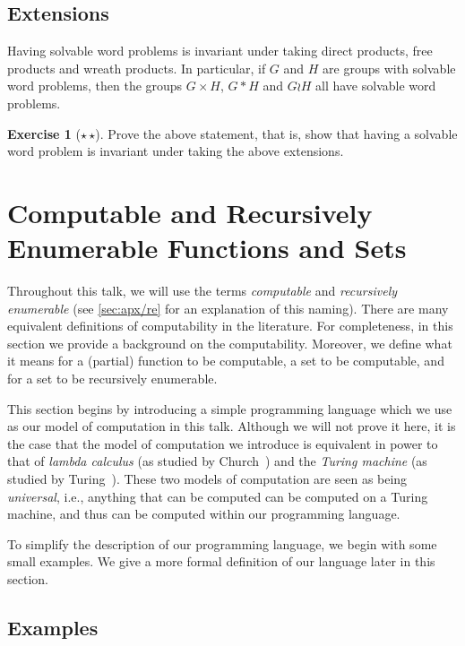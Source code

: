 \documentclass[11pt,a4paper,reqno]{amsart}
\theoremstyle{plain}
\theoremstyle{definition}
\theoremstyle{definition}
\newtheorem{exercise}[theorem]{Exercise}
\newcommand\exerciseLevelMedium{$\star${\,}$\star$}
\begin{document}
\subsection{Extensions}

Having solvable word problems is invariant under taking direct products, free products and wreath products.
In particular, if $G$ and $H$ are groups with solvable word problems, then the groups $G\times H$, $G*H$ and $G\wr H$ all have solvable word problems.

\begin{exercise}[\exerciseLevelMedium]
	Prove the above statement, that is, show that having a solvable word problem is invariant under taking the above extensions.
\end{exercise}

\section{Computable and Recursively Enumerable Functions and Sets}\label{sec:computable}

Throughout this talk, we will use the terms \emph{computable} and \emph{recursively enumerable} (see \cref{sec:apx/re} for an explanation of this naming).
There are many equivalent definitions of computability in the literature.
For completeness, in this section we provide a background on the computability.
Moreover, we define what it means for a (partial) function to be computable, a set to be computable, and for a set to be recursively enumerable.

This section begins by introducing a simple programming language which we use as our model of computation in this talk.
Although we will not prove it here, it is the case that the model of computation we introduce is equivalent in power to that of \textit{lambda calculus} (as studied by Church~\cite{church1932}) and the \textit{Turing machine} (as studied by Turing~\cite{turing1936}).
These two models of computation are seen as being \textit{universal}, i.e., anything that can be computed can be computed on a Turing machine, and thus can be computed within our programming language.

To simplify the description of our programming language, we begin with some small examples.
We give a more formal definition of our language later in this section.

\subsection{Examples}
\end{document}
